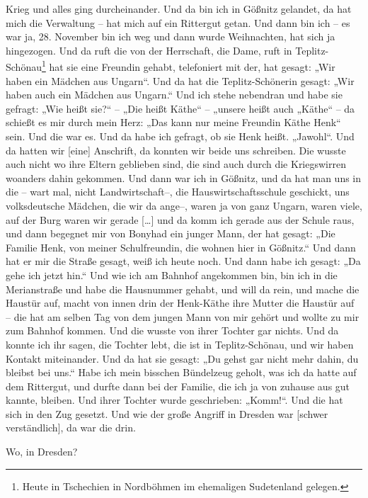 \documentclass[ngerman,]{article}
\providecommand{\tightlist}{%
  \setlength{\itemsep}{0pt}\setlength{\parskip}{0pt}}
\begin{document}
\begin{multicols}{3}
\begin{description}
Krieg und alles ging durcheinander. Und da bin ich in Gößnitz gelandet,
da hat mich die Verwaltung – hat mich auf ein Rittergut getan. Und dann
bin ich – es war ja, 28. November bin ich weg und dann wurde
Weihnachten, hat sich ja hingezogen. Und da ruft die von der Herrschaft,
die Dame, ruft in Teplitz-Schönau\footnote{Heute in Tschechien in
  Nordböhmen im ehemaligen Sudetenland gelegen.} hat sie eine Freundin
gehabt, telefoniert mit der, hat gesagt: „Wir haben ein Mädchen aus
Ungarn“. Und da hat die Teplitz-Schönerin gesagt: „Wir haben auch ein
Mädchen aus Ungarn.“ Und ich stehe nebendran und habe sie gefragt: „Wie
heißt sie?“ – „Die heißt Käthe“ – „unsere heißt auch „Käthe“ – da
schießt es mir durch mein Herz: „Das kann nur meine Freundin Käthe Henk“
sein. Und die war es. Und da habe ich gefragt, ob sie Henk heißt.
„Jawohl“. Und da hatten wir {[}eine{]} Anschrift, da konnten wir beide
uns schreiben. Die wusste auch nicht wo ihre Eltern geblieben sind, die
sind auch durch die Kriegswirren woanders dahin gekommen. Und dann war
ich in Gößnitz, und da hat man uns in die – wart mal, nicht
Landwirtschaft–, die Hauswirtschaftsschule geschickt, uns volksdeutsche
Mädchen, die wir da ange–, waren ja von ganz Ungarn, waren viele, auf
der Burg waren wir gerade {[}\ldots{}{]} und da komm ich gerade aus der
Schule raus, und dann begegnet mir von Bonyhad ein junger Mann, der hat
gesagt: „Die Familie Henk, von meiner Schulfreundin, die wohnen hier in
Gößnitz.“ Und dann hat er mir die Straße gesagt, weiß ich heute noch.
Und dann habe ich gesagt: „Da gehe ich jetzt hin.“ Und wie ich am
Bahnhof angekommen bin, bin ich in die Merianstraße und habe die
Hausnummer gehabt, und will da rein, und mache die Haustür auf, macht
von innen drin der Henk-Käthe ihre Mutter die Haustür auf – die hat am
selben Tag von dem jungen Mann von mir gehört und wollte zu mir zum
Bahnhof kommen. Und die wusste von ihrer Tochter gar nichts. Und da
konnte ich ihr sagen, die Tochter lebt, die ist in Teplitz-Schönau, und
wir haben Kontakt miteinander. Und da hat sie gesagt: „Du gehst gar
nicht mehr dahin, du bleibst bei uns.“ Habe ich mein bisschen Bündelzeug
geholt, was ich da hatte auf dem Rittergut, und durfte dann bei der
Familie, die ich ja von zuhause aus gut kannte, bleiben. Und ihrer
Tochter wurde geschrieben: „Komm!“. Und die hat sich in den Zug gesetzt.
Und wie der große Angriff in Dresden war {[}schwer verständlich{]}, da
war die drin.
\end{description}

\begin{description}
\tightlist
\item[Ruth]
Wo, in Dresden?
\end{description}


\end{multicols}
\end{document}
